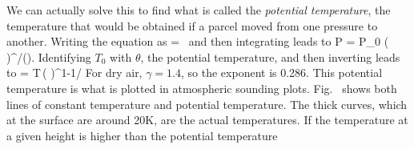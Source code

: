 \documentclass[11pt]{book}
\begin{document}
We can actually solve this to find what is called the {\it potential temperature}, the temperature that would be obtained if a parcel moved from one pressure to another. Writing the equation as
\be
{} = \,
\ee
and then integrating leads to
\be
P = P_0 \left(  \right)^{\gamma/()}.\ee
Identifying $T_0$ with $\theta$, the potential temperature, and then inverting leads to 
\be
\theta = T\,\left(  \right)^{1-1/\gamma}
\ee
For dry air, $\gamma=1.4$, so the exponent is 0.286. This potential temperature is what is plotted in atmospheric sounding plots. Fig.~ shows both lines of constant temperature and potential temperature. The thick curves, which at the surface are around 20K, are the actual temperatures. If the temperature at a given height is higher than the potential temperature


\end{document}
